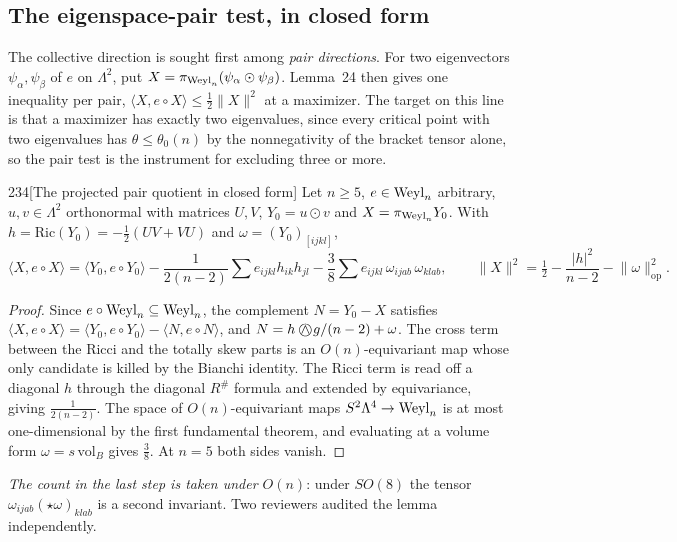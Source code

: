 \subsection{The eigenspace-pair test, in closed form}\label{sec:pairtest}

The collective direction is sought first among \emph{pair directions}. For two eigenvectors $\psi_\alpha,\psi_\beta$ of $e$ on $\Lambda^2$, put $X=\pi_{\Weyl_n}(\psi_\alpha\odot\psi_\beta)$. Lemma~24 then gives one inequality per pair, $\langle X,e\circ X\rangle\le\tfrac12\lVert X\rVert^2$ at a maximizer. The target on this line is that a maximizer has exactly two eigenvalues, since every critical point with two eigenvalues has $\theta\le\theta_0(n)$ by the nonnegativity of the bracket tensor alone, so the pair test is the instrument for excluding three or more.

\begin{Lem}{234}[The projected pair quotient in closed form]
Let $n\ge5$, $e\in\Weyl_n$ arbitrary, $u,v\in\Lambda^2$ orthonormal with matrices $U,V$, $Y_0=u\odot v$ and $X=\pi_{\Weyl_n}Y_0$. With $h=\mathrm{Ric}(Y_0)=-\tfrac12(UV+VU)$ and $\omega=(Y_0)_{[ijkl]}$,
\[
\langle X,e\circ X\rangle=\langle Y_0,e\circ Y_0\rangle-\frac{1}{2(n-2)}\sum e_{ijkl}h_{ik}h_{jl}-\frac38\sum e_{ijkl}\,\omega_{ijab}\,\omega_{klab},
\qquad
\lVert X\rVert^2=\tfrac12-\frac{\lvert h\rvert^2}{n-2}-\lVert\omega\rVert^2_{\mathrm{op}} .
\]
\end{Lem}

\begin{proof}
Since $e\circ\Weyl_n\subseteq\Weyl_n$, the complement $N=Y_0-X$ satisfies $\langle X,e\circ X\rangle=\langle Y_0,e\circ Y_0\rangle-\langle N,e\circ N\rangle$, and $N=h\owedge g/(n-2)+\omega$. The cross term between the Ricci and the totally skew parts is an $O(n)$-equivariant map whose only candidate is killed by the Bianchi identity. The Ricci term is read off a diagonal $h$ through the diagonal $R^\#$ formula and extended by equivariance, giving $\tfrac1{2(n-2)}$. The space of $O(n)$-equivariant maps $S^2\Lambda^4\to\Weyl_n$ is at most one-dimensional by the first fundamental theorem, and evaluating at a volume form $\omega=s\,\mathrm{vol}_B$ gives $\tfrac38$. At $n=5$ both sides vanish.
\end{proof}

\emph{The count in the last step is taken under $O(n)$}: under $SO(8)$ the tensor $\omega_{ijab}(\star\omega)_{klab}$ is a second invariant. Two reviewers audited the lemma independently.

